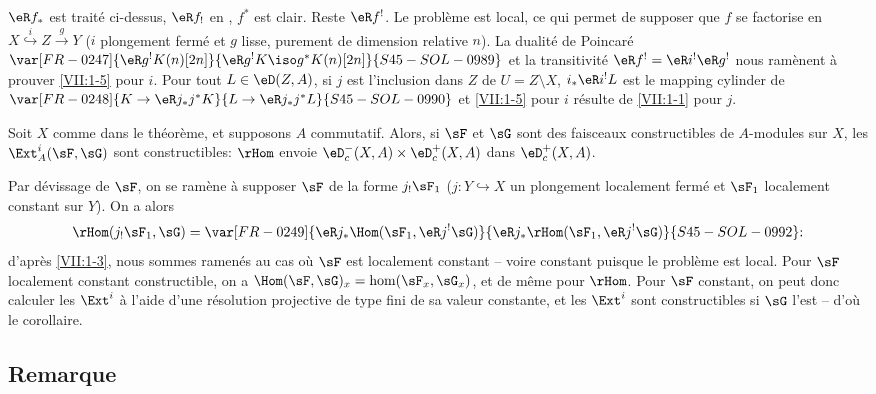 $\eR f_\ast$ est traité ci-dessus, $\eR f_!$ en , 
$f^\ast$ est clair. Reste $\eR f^!$. Le problème est local, ce qui permet de 
supposer que $f$ se factorise en $X\overset{i}{\hookrightarrow} Z \xrightarrow g Y$ ($i$ 
plongement fermé et $g$ lisse, purement de dimension relative $n$). La 
dualité de Poincaré $\var[FR-0247]{\eR g^! K(n)[2 n]}{\eR g^! K \iso g^\ast K(n)[2 n]}{S45-SOL-0989}$ et la transitivité 
$\eR f^! = \eR i^! \eR g^!$ nous ramènent à prouver \ref{VII:1-5} pour $i$. 
Pour tout $L\in \eD(Z,A)$, si $j$ est l'inclusion dans $Z$ de $U=Z\setminus X$, 
$i_\ast \eR i^! L$ est le mapping cylinder de $\var[FR-0248]{K\to \eR j_\ast j^\ast K}{L\to \eR j_\ast j^\ast L}{S45-SOL-0990}$ et 
\ref{VII:1-5} pour $i$ résulte de \ref{VII:1-1} pour $j$. 





\begin{corollary_}\label{VII:1-6}
Soit $X$ comme dans le théorème, et supposons $A$ commutatif. Alors, si 
$\sF$ et $\sG$ sont des faisceaux constructibles de $A$-modules sur $X$, les 
$\Ext_A^i(\sF,\sG)$ sont constructibles: $\rHom$ envoie 
$\eD_c^-(X,A)\times \eD_c^+(X,A)$ dans $\eD_c^+(X,A)$. 
\end{corollary_}

Par dévissage de $\sF$, on se ramène à supposer $\sF$ de la forme 
$j_!\sF_1$ ($j:Y\hookrightarrow X$ un plongement localement fermé et $\sF_1$ 
localement constant sur $Y$). On a alors 
\[
  \rHom(j_! \sF_1,\sG) = \var[FR-0249]{\eR j_\ast \Hom(\sF_1,\eR j^! \sG)}{\eR j_\ast \rHom(\sF_1,\eR j^! \sG)}{S45-SOL-0992} \text{:} 
\]
d'après \ref{VII:1-3}, nous sommes ramenés au cas où $\sF$ est localement 
constant -- voire constant puisque le problème est local. Pour $\sF$ 
localement constant constructible, on a $\Hom(\sF,\sG)_x=\hom(\sF_x,\sG_x)$, 
et de même pour $\rHom$. Pour $\sF$ constant, on peut donc calculer les 
$\Ext^i$ à l'aide d'une résolution projective de type fini de sa valeur 
constante, et les $\Ext^i$ sont constructibles si $\sG$ l'est -- d'où le 
corollaire. 





\subsection{Remarque}\label{VII:1-7}


